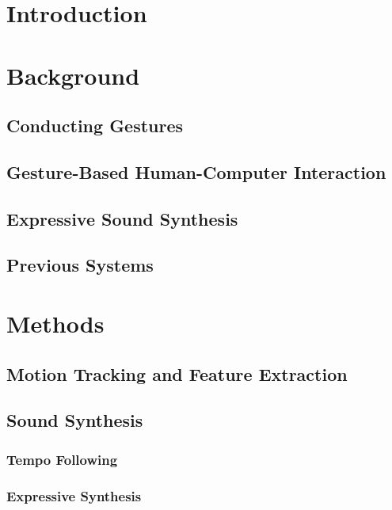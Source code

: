 \chapter{Introduction}
\label{chapter:intro}


\chapter{Background}
\label{chapter:background} 

\section{Conducting Gestures}

\section{Gesture-Based Human-Computer Interaction}

\section{Expressive Sound Synthesis}

\section{Previous Systems}

\chapter{Methods}
\label{chapter:methods}

\section{Motion Tracking and Feature Extraction}

\section{Sound Synthesis}

\subsection{Tempo Following}

\subsection{Expressive Synthesis}

